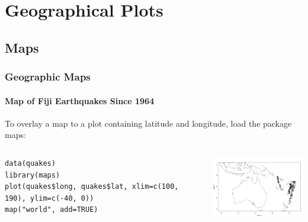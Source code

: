 

\section[Geographical Plots]{Geographical Plots}
\subsection{Maps}

\begin{frame}[fragile]
\frametitle{Geographic Maps}
  \framesubtitle{Map of Fiji Earthquakes Since 1964}

To overlay a map to a plot containing latitude and longitude, load the package \ttfamily maps: \normalfont 
    \begin{columns}
\begin{lstlisting}
data(quakes)
library(maps)
plot(quakes$long, quakes$lat, xlim=c(100, 190), ylim=c(-40, 0))
map("world", add=TRUE)
\end{lstlisting}

       \begin{center}
\includegraphics[width = 55mm]{images/Fuji.pdf}
\end{center}
\end{columns}
\end{frame}


